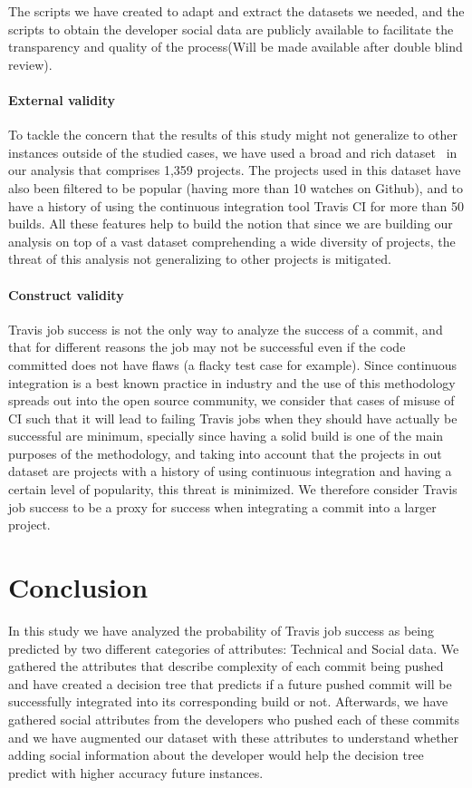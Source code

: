 \documentclass[10pt, conference]{IEEEtran}
\begin{document}
 The scripts we have created to adapt and extract the datasets we needed, and the 
 scripts to obtain the developer social data are publicly available to facilitate 
 the transparency and quality of the process(Will be made available after double blind review).%

\paragraph{External validity} 
 To tackle the concern that the results of this study might not generalize to 
 other instances outside of the studied cases, we have used a broad and rich 
 dataset~\cite{msr17challenge} in our analysis that comprises 1,359 projects. The 
 projects used in this dataset have also been filtered to be popular (having more 
 than 10 watches on Github), and to have a history of using the continuous 
 integration tool Travis CI for more than 50 builds. All these features help to 
 build the notion that since we are building our analysis on top of a vast 
 dataset comprehending a wide diversity of projects, the threat of this analysis 
 not generalizing to other projects is mitigated.

\paragraph{Construct validity}
 Travis job success is not the only way to analyze the success of a commit, and 
 that for different reasons the job may not be successful even if the code 
 committed does not have flaws (a flacky test case for example). Since continuous 
 integration is a best known practice in industry and the use of this methodology 
 spreads out into the open source community, we consider that cases of misuse of 
 CI such that it will lead to failing Travis jobs when they should have actually 
 be successful are minimum, specially since having a solid build is one of the 
 main purposes of the methodology, and taking into account that the projects in 
 out dataset are projects with a history of using continuous integration and 
 having a certain level of popularity, this threat is minimized. We therefore 
 consider Travis job success to be a proxy 
 for success when integrating a commit into a larger project.

\section{Conclusion}
In this study we have analyzed the probability of Travis job success as being predicted by two different categories of attributes: Technical and Social data.
We gathered the attributes that describe complexity of each commit being pushed and have created a decision tree that predicts if a future pushed commit will be successfully integrated into its corresponding build or not.
Afterwards, we have gathered social attributes from the developers who pushed each of these commits
and we have augmented our dataset with these attributes to understand whether adding social information about the developer would help the decision tree predict with higher accuracy future 
instances.
\end{document}
